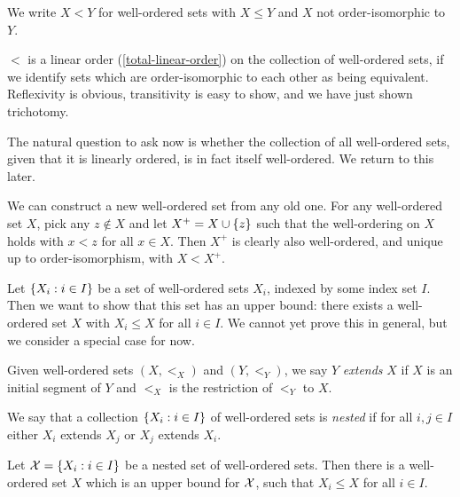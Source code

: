 \documentclass{article}
\begin{document}
We write $X < Y$ for well-ordered sets with $X \leq Y$ and $X$ not order-isomorphic to $Y$.

\begin{corollary}
    $<$ is a linear order (\ref{total-linear-order}) on the collection of well-ordered sets, if we identify sets which are order-isomorphic to each other as being equivalent. Reflexivity is obvious, transitivity is easy to show, and we have just shown trichotomy.
\end{corollary}

\begin{note}
	The natural question to ask now is whether the collection of all well-ordered sets, given that it is linearly ordered, is in fact itself well-ordered. We return to this later.
\end{note}

\begin{note}
	We can construct a new well-ordered set from any old one. For any well-ordered set $X$, pick any $z \notin X$ and let $X^+ = X \cup \left\lbrace z \right\rbrace$ such that the well-ordering on $X$ holds with $x < z$ for all $x \in X$. Then $X^+$ is clearly also well-ordered, and unique up to order-isomorphism, with $X < X^+$.
\end{note}

\begin{note}
	Let $\left\lbrace X_i : i \in I \right\rbrace$ be a set of well-ordered sets $X_i$, indexed by some index set $I$. Then we want to show that this set has an upper bound: there exists a well-ordered set $X$ with $X_i \leq X$ for all $i \in I$. We cannot yet prove this in general, but we consider a special case for now.
\end{note}

\begin{definition}
    Given well-ordered sets $(X, <_X)$ and $(Y, <_Y)$, we say $Y$ \textit{extends} $X$ if $X$ is an initial segment of $Y$ and $<_X$ is the restriction of $<_Y$ to $X$.
    
    We say that a collection $\left\lbrace X_i : i \in I \right\rbrace$ of well-ordered sets is \textit{nested} if for all $i, j \in I$ either $X_i$ extends $X_j$ or $X_j$ extends $X_i$.
\end{definition}

\begin{proposition}
	\label{nested-collection-upper-bound}
    Let $\mathcal{X} = \left\lbrace X_i : i \in I \right\rbrace$ be a nested set of well-ordered sets. Then there is a well-ordered set $X$ which is an upper bound for $\mathcal{X}$, such that $X_i \leq X$ for all $i \in I$.
\end{proposition}
\end{document}
